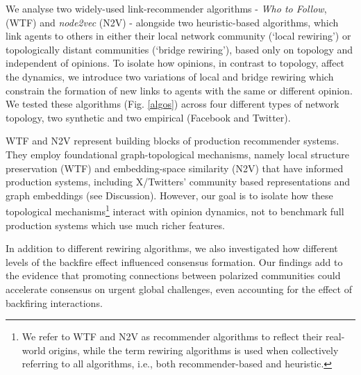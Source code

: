 \documentclass[unnumsec,webpdf,contemporary,large]{oup-authoring-template}%
\theoremstyle{thmstyleone}%
\theoremstyle{thmstyletwo}%
\theoremstyle{thmstylethree}%
\begin{document}
We analyse two widely-used \cite{espin-noboa_inequality_2022} link-recommender algorithms - \textit{Who to Follow}, (WTF) and \textit{node2vec} (N2V) - alongside two heuristic-based algorithms, which link agents to others in either their local network community (`local rewiring') or topologically distant communities (`bridge rewiring'), based only on topology and independent of opinions. To isolate how opinions, in contrast to topology, affect the dynamics, we introduce two variations of local and bridge rewiring which constrain the formation of new links to agents with the same or different opinion. We tested these algorithms (Fig. \ref{algos}) across four different types of network topology, two synthetic and two empirical (Facebook and Twitter).

WTF and N2V represent building blocks of production recommender systems. They employ foundational graph-topological mechanisms, namely local structure preservation (WTF) and embedding-space similarity (N2V) that have informed production systems, including X/Twitters' community based representations and graph embeddings (see Discussion). However, our goal is to isolate how these topological mechanisms\footnote{ We refer to WTF and N2V as recommender algorithms  to reflect their real-world origins, while the term rewiring algorithms is used when collectively referring to all algorithms, i.e., both recommender-based and heuristic.} interact with opinion dynamics, not to benchmark full production systems which use much richer features.

In addition to different rewiring algorithms, we also investigated how different levels of the backfire effect influenced consensus formation. Our findings add to the evidence that promoting connections between polarized communities could accelerate consensus on urgent global challenges, even accounting for the effect of backfiring interactions.
\end{document}

